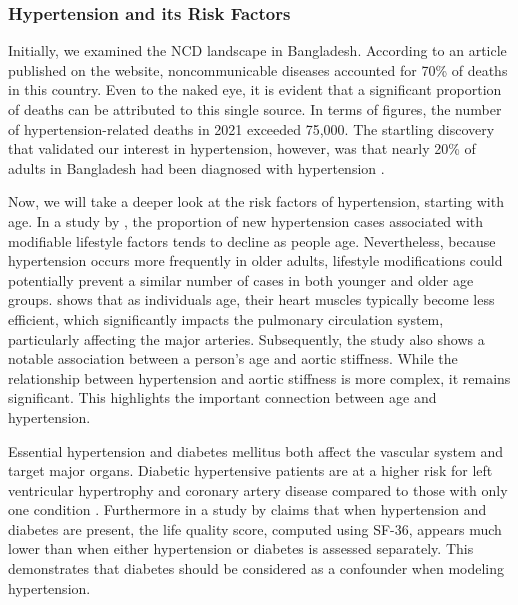 \documentclass[
  12pt,
  a4paper]{article}
\begin{document}
\subsubsection{Hypertension and its Risk Factors}\label{hypertension-and-its-risk-factors}

Initially, we examined the NCD landscape in Bangladesh. According to an article published on the \citet{icddrb_icddrb_2021} website, noncommunicable diseases accounted for 70\% of deaths in this country. Even to the naked eye, it is evident that a significant proportion of deaths can be attributed to this single source. In terms of figures, the number of hypertension-related deaths in 2021 exceeded 75,000. The startling discovery that validated our interest in hypertension, however, was that nearly 20\% of adults in Bangladesh had been diagnosed with hypertension \citep{rahman_prevalence_2018}.

Now, we will take a deeper look at the risk factors of hypertension, starting with age. In a study by \citet{cohen_influence_2012}, the proportion of new hypertension cases associated with modifiable lifestyle factors tends to decline as people age. Nevertheless, because hypertension occurs more frequently in older adults, lifestyle modifications could potentially prevent a similar number of cases in both younger and older age groups. \citet{mceniery_age_2007} shows that as individuals age, their heart muscles typically become less efficient, which significantly impacts the pulmonary circulation system, particularly affecting the major arteries. Subsequently, the study also shows a notable association between a person's age and aortic stiffness. While the relationship between hypertension and aortic stiffness is more complex, it remains significant. This highlights the important connection between age and hypertension.

Essential hypertension and diabetes mellitus both affect the vascular system and target major organs. Diabetic hypertensive patients are at a higher risk for left ventricular hypertrophy and coronary artery disease compared to those with only one condition \citep{grossman2008hypertension}. Furthermore in a study by \citet{10.1097/HJR.0b013e3280803f29} claims that when hypertension and diabetes are present, the life quality score, computed using SF-36, appears much lower than when either hypertension or diabetes is assessed separately. This demonstrates that diabetes should be considered as a confounder when modeling hypertension.
\end{document}
